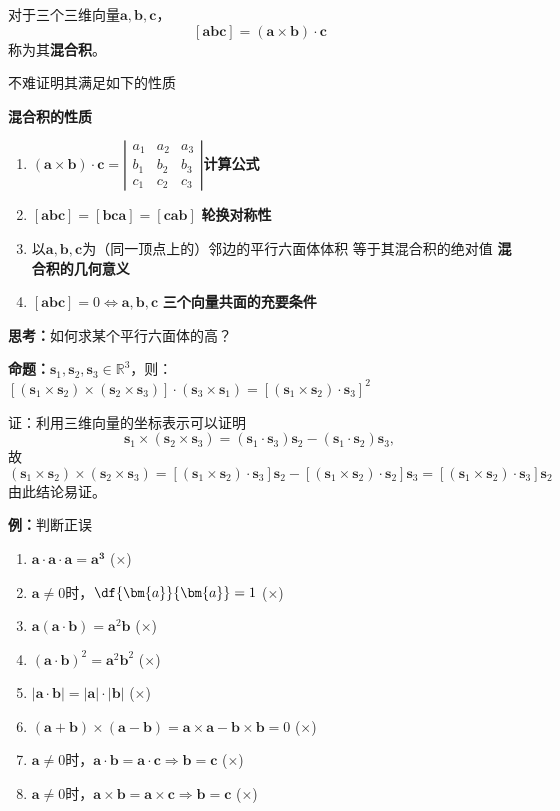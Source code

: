 对于三个三维向量$\bm{a},\bm{b},\bm{c}$，
$$[\bm{abc}]=(\bm{a}\times\bm{b})\cdot\bm{c}$$
称为其{\bf 混合积}。

不难证明其满足如下的性质
\begin{thx}
	{\bf 混合积的性质}
	\begin{enumerate}%
	  \item $(\bm{a}\times\bm{b})\cdot\bm{c}=
	  \left|\begin{array}{ccc}
		a_1 & a_2 & a_3\\
		b_1 & b_2 & b_3\\
		c_1 & c_2 & c_3
		\end{array}\right|$\hfill{\bf 计算公式} 
	  \item $[\bm{abc}]=[\bm{bca}] =[\bm{cab}]$
	  \hfill {\bf 轮换对称性} 
	  \item 以$\bm{a},\bm{b},\bm{c}$为（同一顶点上的）邻边的平行六面体体积
	  等于其混合积的绝对值
	  \hfill {\bf 混合积的几何意义} 
	  \item $[\bm{abc}]=0\Leftrightarrow\bm{a},\bm{b},\bm{c}$
	  \hfill {\bf 三个向量共面的充要条件}
	\end{enumerate}
\end{thx}

{\bf 思考：}如何求某个平行六面体的高？

\begin{shaded}
	{\bf 命题：}$\bm{s}_1,\bm{s}_2,\bm{s}_3\in\mathbb{R}^3$，则：
	$\left[(\bm{s}_1\times\bm{s}_2)\times(\bm{s}_2\times\bm{s}_3)\right]
	\cdot(\bm{s}_3\times\bm{s}_1)=
	\left[(\bm{s}_1\times\bm{s}_2)\cdot\bm{s}_3\right]^2$
	
	证：利用三维向量的坐标表示可以证明
	$$\bm{s}_1\times(\bm{s}_2\times\bm{s}_3)
	=(\bm{s}_1\cdot\bm{s}_3)\bm{s}_2
	-(\bm{s}_1\cdot\bm{s}_2)\bm{s}_3,$$
	故
	$$(\bm{s}_1\times\bm{s}_2)\times(\bm{s}_2\times\bm{s}_3)
	=[(\bm{s}_1\times\bm{s}_2)\cdot\bm{s}_3]\bm{s}_2
	-[(\bm{s}_1\times\bm{s}_2)\cdot\bm{s}_2]\bm{s}_3
	=[(\bm{s}_1\times\bm{s}_2)\cdot\bm{s}_3]\bm{s}_2$$
	由此结论易证。
\end{shaded}

{\bf 例：}判断正误
\begin{enumerate}[(1)]
  \setlength{\itemindent}{1cm}
  \item $\bm{a}\cdot\bm{a}\cdot\bm{a}=\bm{a^3}$
  \quad(\;${\times}$\;)
  \item $\bm{a}\ne 0$时，$\df{\bm{a}}{\bm{a}}=1$
  \quad(\;${\times}$\;)
  \item $\bm{a}(\bm{a}\cdot\bm{b})=\bm{a}^2\bm{b}$
  \quad(\;${\times}$\;)
  \item $(\bm{a}\cdot\bm{b})^2=\bm{a}^2\bm{b}^2$
  \quad(\;${\times}$\;)
  \item $|\bm{a}\cdot\bm{b}|=|\bm{a}|\cdot|\bm{b}|$
  \quad(\;${\times}$\;)
  \item $(\bm{a}+\bm{b})\times(\bm{a}-\bm{b})=\bm{a}\times\bm{a}
  -\bm{b}\times\bm{b}=0$
  \quad(\;${\times}$\;)
  \item $\bm{a}\ne
  0$时，$\bm{a}\cdot\bm{b}=\bm{a}\cdot\bm{c}\Rightarrow\bm{b}=\bm{c}$
  \quad(\;${\times}$\;)
  \item $\bm{a}\ne
  0$时，$\bm{a}\times\bm{b}=\bm{a}\times\bm{c}\Rightarrow\bm{b}=\bm{c}$
  \quad(\;${\times}$\;)
\end{enumerate}

